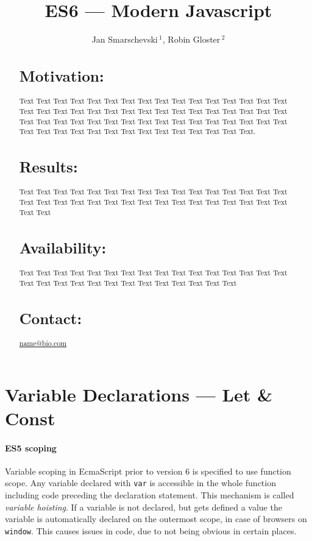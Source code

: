 \documentclass{bioinfo}
\begin{document}
\title[short Title]{ES6 --- Modern Javascript}
\author[Smarschevski, Gloster]{Jan Smarschevski\,$^{1}$, Robin Gloster\,$^{2}$}
\address{$^{1}$Department of XXXXXXX, Address XXXX etc.\\
$^{2}$robin.gloster@tum.de}

\maketitle

\begin{abstract}

\section{Motivation:}
Text Text Text  Text Text Text Text Text Text Text Text
Text  Text Text Text Text Text Text Text Text Text  Text Text Text Text Text Text Text Text Text  Text Text Text Text Text Text Text Text Text  Text Text Text Text Text Text Text Text Text  Text Text Text Text Text Text Text Text Text  Text Text Text Text Text.

\section{Results:}
Text  Text Text Text Text Text Text Text Text Text  Text Text Text Text Text Text Text Text Text  Text Text Text Text Text Text Text Text Text  Text Text Text Text Text Text

\section{Availability:}
Text  Text Text Text Text Text Text Text Text Text  Text Text Text Text Text Text Text Text Text  Text Text Text Text Text Text Text Text Text  Text

\section{Contact:} \href{name@bio.com}{name@bio.com}
\end{abstract}

\section{Variable Declarations --- Let \& Const}
\paragraph{ES5 scoping\textcolon}
Variable scoping in EcmaScript prior to version 6 is specified to use function scope.
Any variable declared with {\tt var} is accessible in the whole function including
code preceding the declaration statement. This mechanism is called {\em variable hoisting}.
If a variable is not declared, but gets defined a value the variable is automatically declared
on the outermost scope, in case of browsers on {\tt window}. This causes issues in code, due
to not being obvious in certain places.
\end{document}

